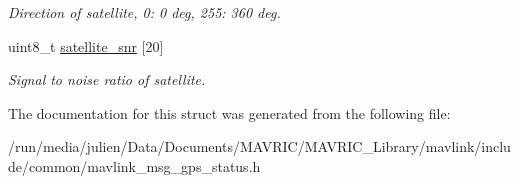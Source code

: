 \begin{DoxyCompactItemize}
\begin{DoxyCompactList}\small\item\em Direction of satellite, 0\+: 0 deg, 255\+: 360 deg. \end{DoxyCompactList}\item 
\hypertarget{struct____mavlink__gps__status__t_af5c2ca556c0063e74f387849118d9f33}{uint8\+\_\+t \hyperlink{struct____mavlink__gps__status__t_af5c2ca556c0063e74f387849118d9f33}{satellite\+\_\+snr} \mbox{[}20\mbox{]}}\label{struct____mavlink__gps__status__t_af5c2ca556c0063e74f387849118d9f33}

\begin{DoxyCompactList}\small\item\em Signal to noise ratio of satellite. \end{DoxyCompactList}\end{DoxyCompactItemize}


The documentation for this struct was generated from the following file\+:\begin{DoxyCompactItemize}
\item 
/run/media/julien/\+Data/\+Documents/\+M\+A\+V\+R\+I\+C/\+M\+A\+V\+R\+I\+C\+\_\+\+Library/mavlink/include/common/mavlink\+\_\+msg\+\_\+gps\+\_\+status.\+h\end{DoxyCompactItemize}
